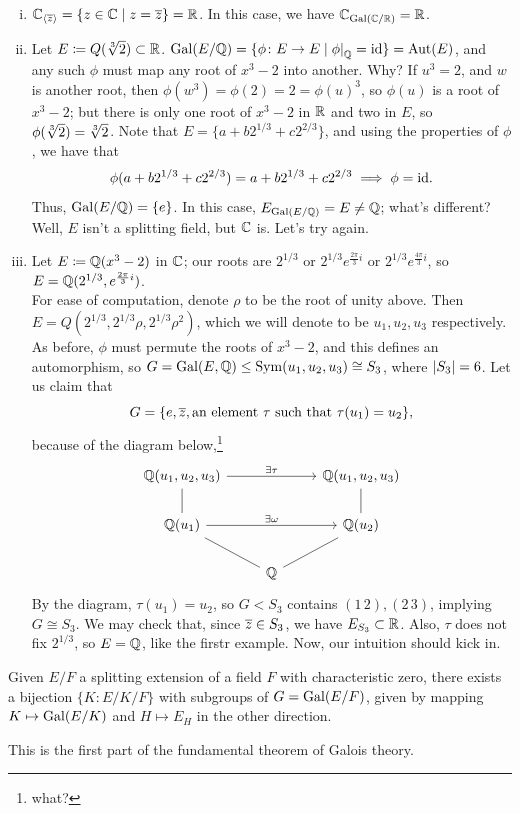 \begin{enumerate}[(i)]
    \item $\mathbb C_{\left<\overline z\right>} = \{z \in \mathbb C \mid z = \overline z\} = \mathbb R$. In this case, we have $\mathbb C_{\operatorname{Gal}(\mathbb C/\mathbb R)} = \mathbb R$.
    \item Let $E \coloneq Q(\sqrt[3]{2}) \subset \mathbb R$. $\Gal(E/\QQ) = \{\phi \colon E \to E \mid \restr{\phi}{\QQ} = \id\} = \Aut(E)$, and any such $\phi$ must map any root of $x^3 - 2$ into another. Why? If $u^3 = 2$, and $w$ is another root, then $\phi(w^3) = \phi(2) = 2 = \phi(u)^3$, so $\phi(u)$ is a root of $x^3 - 2$; but there is only one root of $x^3 - 2$ in $\mathbb R$ and two in $E$, so $\phi(\sqrt[3]{2}) = \sqrt[3]{2}$. Note that $E = \{a + b 2^{1/3} + c 2^{2/3}\}$, and using the properties of $\phi$, we have that
    \[ \phi(a + b 2^{1/3} + c 2^{2/3}) = a + b 2^{1/3} + c 2^{2/3} \implies \phi = \mathrm{id}. \]
    Thus, $\operatorname{Gal}(E/\mathbb Q) = \{e\}$. In this case, $E_{\operatorname{Gal}(E/\mathbb Q)} = E \neq \mathbb Q$; what's different? Well, $E$ isn't a splitting field, but $\mathbb C$ is. Let's try again.
    \item Let $E \coloneq \mathbb Q(x^3 - 2)$ in $\mathbb C$; our roots are $2^{1/3}$ or $2^{1/3} e^{\frac{2\pi}{3} i}$ or $2^{1/3} e^{\frac{4\pi}{3} i}$, so $E = \mathbb Q(2^{1/3}, e^{\frac{2\pi}{3} i})$.
    \\[8pt]
    For ease of computation, denote $\rho$ to be the root of unity above. Then $E = Q(2^{1/3}, 2^{1/3} \rho, 2^{1/3} \rho^2)$, which we will denote to be $u_1, u_2, u_3$ respectively. As before, $\phi$ must permute the roots of $x^3 - 2$, and this defines an automorphism, so $G = \operatorname{Gal}(E, \mathbb Q) \leq \mathrm{Sym}(u_1, u_2, u_3) \cong S_3$, where $\left\lvert S_3 \right\rvert = 6$. Let us claim that
    \[ G = \{e, \overline z, \text{an element $\tau$ such that $\tau(u_1) = u_2$}\}, \]
    because of the diagram below,\footnote{what?}
    \[
        \begin{tikzcd} \QQ(u_1, u_2, u_3) \arrow[rr, "\exists \tau"] & & \QQ(u_1, u_2, u_3) \\
            \QQ(u_1) \arrow[u, dash] \arrow[rr, "\exists \omega"] & & \QQ(u_2) \arrow[u, dash] \\
            & \QQ \arrow[ul, dash] \arrow[ur, dash] &
        \end{tikzcd}
    \]
    By the diagram, $\tau(u_1) = u_2$, so $G < S_3$ contains $(1 \, 2), (2 \, 3)$, implying $G \cong S_3$. We may check that, since $\overline z \in S_3$, we have $E_{S_3} \subset \mathbb R$. Also, $\tau$ does not fix $2^{1/3}$, so $E = \mathbb Q$, like the firstr example. Now, our intuition should kick in.
\end{enumerate}
\begin{theorem}
    Given $E/F$ a splitting extension of a field $F$ with characteristic zero, there exists a bijection $\{K : E/K/F\}$ with subgroups of $G = \operatorname{Gal}(E/F)$, given by mapping $K \mapsto \operatorname{Gal}(E/K)$ and $H \mapsto E_H$ in the other direction.
\end{theorem}
This is the first part of the fundamental theorem of Galois theory.